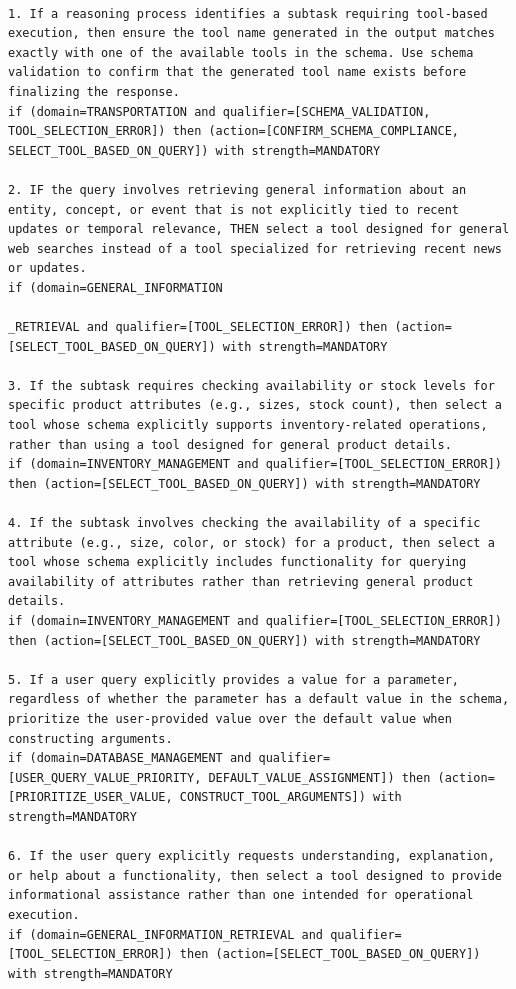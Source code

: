 \documentclass[11pt]{article}
\begin{document}
\begin{lstlisting}[style=rulestyle, caption={Sample rules learned from the BFCL: Live-Multiple dataset}]

1. If a reasoning process identifies a subtask requiring tool-based execution, then ensure the tool name generated in the output matches exactly with one of the available tools in the schema. Use schema validation to confirm that the generated tool name exists before finalizing the response.
if (domain=TRANSPORTATION and qualifier=[SCHEMA_VALIDATION, TOOL_SELECTION_ERROR]) then (action=[CONFIRM_SCHEMA_COMPLIANCE, SELECT_TOOL_BASED_ON_QUERY]) with strength=MANDATORY

2. IF the query involves retrieving general information about an entity, concept, or event that is not explicitly tied to recent updates or temporal relevance, THEN select a tool designed for general web searches instead of a tool specialized for retrieving recent news or updates.
if (domain=GENERAL_INFORMATION

_RETRIEVAL and qualifier=[TOOL_SELECTION_ERROR]) then (action=[SELECT_TOOL_BASED_ON_QUERY]) with strength=MANDATORY

3. If the subtask requires checking availability or stock levels for specific product attributes (e.g., sizes, stock count), then select a tool whose schema explicitly supports inventory-related operations, rather than using a tool designed for general product details.
if (domain=INVENTORY_MANAGEMENT and qualifier=[TOOL_SELECTION_ERROR]) then (action=[SELECT_TOOL_BASED_ON_QUERY]) with strength=MANDATORY

4. If the subtask involves checking the availability of a specific attribute (e.g., size, color, or stock) for a product, then select a tool whose schema explicitly includes functionality for querying availability of attributes rather than retrieving general product details.
if (domain=INVENTORY_MANAGEMENT and qualifier=[TOOL_SELECTION_ERROR]) then (action=[SELECT_TOOL_BASED_ON_QUERY]) with strength=MANDATORY

5. If a user query explicitly provides a value for a parameter, regardless of whether the parameter has a default value in the schema, prioritize the user-provided value over the default value when constructing arguments.
if (domain=DATABASE_MANAGEMENT and qualifier=[USER_QUERY_VALUE_PRIORITY, DEFAULT_VALUE_ASSIGNMENT]) then (action=[PRIORITIZE_USER_VALUE, CONSTRUCT_TOOL_ARGUMENTS]) with strength=MANDATORY

6. If the user query explicitly requests understanding, explanation, or help about a functionality, then select a tool designed to provide informational assistance rather than one intended for operational execution.
if (domain=GENERAL_INFORMATION_RETRIEVAL and qualifier=[TOOL_SELECTION_ERROR]) then (action=[SELECT_TOOL_BASED_ON_QUERY]) with strength=MANDATORY


\end{lstlisting}
\end{document}
